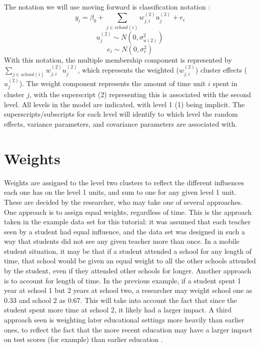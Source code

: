 \documentclass[
]{book}
\begin{document}
The notation we will use moving forward is classification notation \citep{Leckie2013}:\\
\[y_{i} = \beta_{0} + \sum_{j \in school(i)}w_{j,i}^{(2)}u_{j}^{(2)} + e_{i}\]
\[u_{j}^{(2)} \sim N(0, \sigma_{u(2)}^{2})\]
\[e_{i} \sim N(0, \sigma_{e}^{2})\]
With this notation, the multiple membership component is represented by \(\sum_{j \in school(i)}w_{j,i}^{(2)}u_{j}^{(2)}\), which represents the weighted (\(w_{j,i}^{(2)}\)) cluster effects (\(u_{j}^{(2)}\)). The weight component represents the amount of time unit \(\textit{i}\) spent in cluster \(\textit{j}\), with the superscript (2) representing this is associated with the second level. All levels in the model are indicated, with level 1 (1) being implicit. The superscripts/subscripts for each level will identify to which level the random effects, variance parameters, and covariance parameters are associated with.

\hypertarget{weights}{%
\section{Weights}\label{weights}}

Weights are assigned to the level two clusters to reflect the different influences each one has on the level 1 units, and sum to one for any given level 1 unit. These are decided by the researcher, who may take one of several approaches. One approach is to assign equal weights, regardless of time. This is the approach taken in the example data set for this tutorial: it was assumed that each teacher seen by a student had equal influence, and the data set was designed in such a way that students did not see any given teacher more than once. In a mobile student situation, it may be that if a student attended a school for any length of time, that school would be given an equal weight to all the other schools attended by the student, even if they attended other schools for longer. Another approach is to account for length of time. In the previous example, if a student spent 1 year at school 1 but 2 years at school two, a researcher may weight school one as 0.33 and school 2 as 0.67. This will take into account the fact that since the student spent more time at school 2, it likely had a larger impact. A third approach seen is weighting later educational settings more heavily than earlier ones, to reflect the fact that the more recent education may have a larger impact on test scores (for example) than earlier education \citep{Chung2012}.
\end{document}
